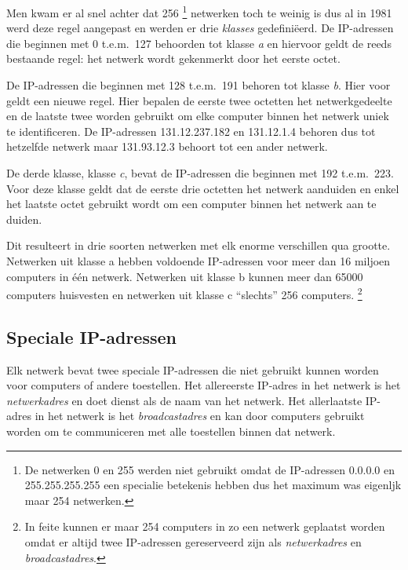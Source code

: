Men kwam er al snel achter dat 256%
   \footnote{De netwerken 0 en 255 werden niet gebruikt omdat de IP-adressen 0.0.0.0 en 255.255.255.255 een specialie betekenis hebben dus het maximum was eigenljk maar 254 netwerken.}
netwerken toch te weinig is dus al in 1981 werd deze regel aangepast en werden er drie \emph{klasses} gedefiniëerd.
De IP-adressen die beginnen met 0 t.e.m.~127 behoorden tot klasse \emph{a} en hiervoor geldt de reeds bestaande regel: het netwerk wordt gekenmerkt door het eerste octet.

De IP-adressen die beginnen met 128 t.e.m.~191 behoren tot klasse \emph{b}. Hier voor geldt een nieuwe regel.
Hier bepalen de eerste twee octetten het netwerkgedeelte en de laatste twee worden gebruikt om elke computer binnen het netwerk uniek te identificeren.
De IP-adressen 131.12.237.182 en 131.12.1.4 behoren dus tot hetzelfde netwerk maar 131.93.12.3 behoort tot een ander netwerk.

De derde klasse, klasse \emph{c}, bevat de IP-adressen die beginnen met 192 t.e.m.~223.
Voor deze klasse geldt dat de eerste drie octetten het netwerk aanduiden en enkel het laatste octet gebruikt wordt om een computer binnen het netwerk aan te duiden.

Dit resulteert in drie soorten netwerken met elk enorme verschillen qua grootte.
Netwerken uit klasse a hebben voldoende IP-adressen voor meer dan 16 miljoen computers in één netwerk.
Netwerken uit klasse b kunnen meer dan \num{65000} computers huisvesten en netwerken uit klasse c ``slechts'' 256 computers.%
   \footnote{In feite kunnen er maar 254 computers in zo een netwerk geplaatst worden omdat er altijd twee IP-adressen gereserveerd zijn als \emph{netwerkadres} en \emph{broadcastadres}.}



\subsection{Speciale IP-adressen}
\label{sec:speciale-ip-adressen}

Elk netwerk bevat twee speciale IP-adressen die niet gebruikt kunnen worden voor computers of andere toestellen.
Het allereerste IP-adres in het netwerk is het \emph{netwerkadres} en doet dienst als de naam van het netwerk.
Het allerlaatste IP-adres in het netwerk is het \emph{broadcastadres} en kan door computers gebruikt worden om te communiceren met alle toestellen binnen dat netwerk.





